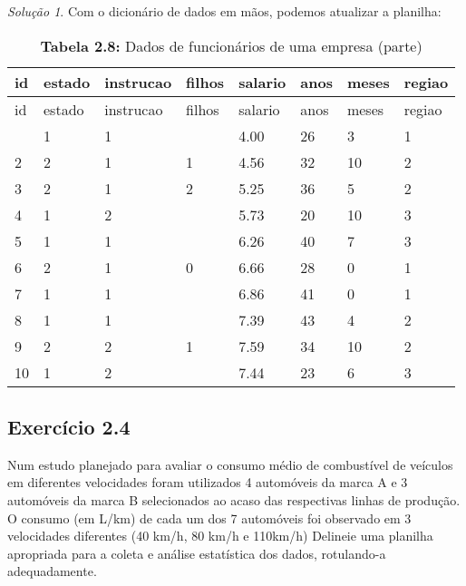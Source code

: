 \documentclass[
]{latex/krantz}
\theoremstyle{definition}
\theoremstyle{definition}
\theoremstyle{definition}
\theoremstyle{definition}
\theoremstyle{remark}
\newtheorem*{solution}{Solução}
\begin{document}
\begin{solution}
Com o dicionário de dados em mãos, podemos atualizar a planilha:

\begin{longtable}[]{@{}llllllll@{}}
\caption{\textbf{Tabela 2.8:} Dados de funcionários de uma empresa (parte)}\tabularnewline
\toprule\noalign{}
id & estado & instrucao & filhos & salario & anos & meses & regiao \\
\midrule\noalign{}
\endfirsthead
\toprule\noalign{}
id & estado & instrucao & filhos & salario & anos & meses & regiao \\
\midrule\noalign{}
\endhead
\bottomrule\noalign{}
\endlastfoot
1 & 1 & 1 & & 4.00 & 26 & 3 & 1 \\
2 & 2 & 1 & 1 & 4.56 & 32 & 10 & 2 \\
3 & 2 & 1 & 2 & 5.25 & 36 & 5 & 2 \\
4 & 1 & 2 & & 5.73 & 20 & 10 & 3 \\
5 & 1 & 1 & & 6.26 & 40 & 7 & 3 \\
6 & 2 & 1 & 0 & 6.66 & 28 & 0 & 1 \\
7 & 1 & 1 & & 6.86 & 41 & 0 & 1 \\
8 & 1 & 1 & & 7.39 & 43 & 4 & 2 \\
9 & 2 & 2 & 1 & 7.59 & 34 & 10 & 2 \\
10 & 1 & 2 & & 7.44 & 23 & 6 & 3 \\
\end{longtable}

\end{solution}

\hypertarget{exr2-4}{%
\subsection*{Exercício 2.4}\label{exr2-4}}

Num estudo planejado para avaliar o consumo médio de combustível de veículos em diferentes velocidades foram utilizados 4 automóveis da marca A e 3 automóveis da marca B selecionados ao acaso das respectivas linhas de produção. O consumo (em L/km) de cada um dos 7 automóveis foi observado em 3 velocidades diferentes (40 km/h, 80 km/h e 110km/h) Delineie uma planilha apropriada para a coleta e análise estatística dos dados, rotulando-a adequadamente.
\end{document}
